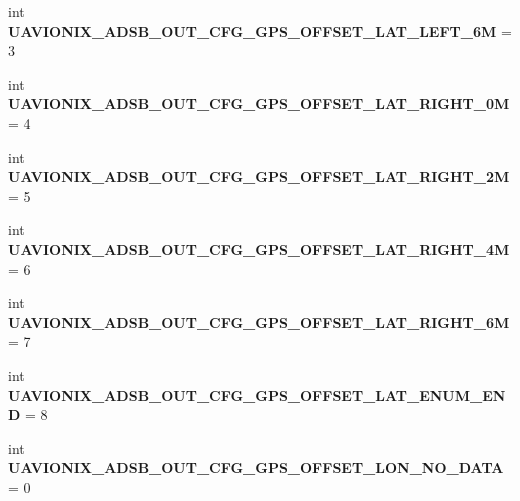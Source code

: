 \begin{DoxyCompactItemize}
\item 
\mbox{\label{namespacepymavlink_1_1dialects_1_1v10_a9ec2deef184e7d16b6c5f5db9652ba2f}} 
int {\bfseries U\+A\+V\+I\+O\+N\+I\+X\+\_\+\+A\+D\+S\+B\+\_\+\+O\+U\+T\+\_\+\+C\+F\+G\+\_\+\+G\+P\+S\+\_\+\+O\+F\+F\+S\+E\+T\+\_\+\+L\+A\+T\+\_\+\+L\+E\+F\+T\+\_\+6M} = 3
\item 
\mbox{\label{namespacepymavlink_1_1dialects_1_1v10_a5bbcbe4a5cdc7784f75c56dc4a454648}} 
int {\bfseries U\+A\+V\+I\+O\+N\+I\+X\+\_\+\+A\+D\+S\+B\+\_\+\+O\+U\+T\+\_\+\+C\+F\+G\+\_\+\+G\+P\+S\+\_\+\+O\+F\+F\+S\+E\+T\+\_\+\+L\+A\+T\+\_\+\+R\+I\+G\+H\+T\+\_\+0M} = 4
\item 
\mbox{\label{namespacepymavlink_1_1dialects_1_1v10_a95748bfd14f6b2c18cf0d106a6e2c0b7}} 
int {\bfseries U\+A\+V\+I\+O\+N\+I\+X\+\_\+\+A\+D\+S\+B\+\_\+\+O\+U\+T\+\_\+\+C\+F\+G\+\_\+\+G\+P\+S\+\_\+\+O\+F\+F\+S\+E\+T\+\_\+\+L\+A\+T\+\_\+\+R\+I\+G\+H\+T\+\_\+2M} = 5
\item 
\mbox{\label{namespacepymavlink_1_1dialects_1_1v10_a21522473ab06b875f9f2141cedf1bad9}} 
int {\bfseries U\+A\+V\+I\+O\+N\+I\+X\+\_\+\+A\+D\+S\+B\+\_\+\+O\+U\+T\+\_\+\+C\+F\+G\+\_\+\+G\+P\+S\+\_\+\+O\+F\+F\+S\+E\+T\+\_\+\+L\+A\+T\+\_\+\+R\+I\+G\+H\+T\+\_\+4M} = 6
\item 
\mbox{\label{namespacepymavlink_1_1dialects_1_1v10_a3e109602b1846c5718e919cb7b5ae41b}} 
int {\bfseries U\+A\+V\+I\+O\+N\+I\+X\+\_\+\+A\+D\+S\+B\+\_\+\+O\+U\+T\+\_\+\+C\+F\+G\+\_\+\+G\+P\+S\+\_\+\+O\+F\+F\+S\+E\+T\+\_\+\+L\+A\+T\+\_\+\+R\+I\+G\+H\+T\+\_\+6M} = 7
\item 
\mbox{\label{namespacepymavlink_1_1dialects_1_1v10_a7e420faff4cb3f61f220dee9a3fc668c}} 
int {\bfseries U\+A\+V\+I\+O\+N\+I\+X\+\_\+\+A\+D\+S\+B\+\_\+\+O\+U\+T\+\_\+\+C\+F\+G\+\_\+\+G\+P\+S\+\_\+\+O\+F\+F\+S\+E\+T\+\_\+\+L\+A\+T\+\_\+\+E\+N\+U\+M\+\_\+\+E\+ND} = 8
\item 
\mbox{\label{namespacepymavlink_1_1dialects_1_1v10_a7b92e0b543130262d80ec14a520e916c}} 
int {\bfseries U\+A\+V\+I\+O\+N\+I\+X\+\_\+\+A\+D\+S\+B\+\_\+\+O\+U\+T\+\_\+\+C\+F\+G\+\_\+\+G\+P\+S\+\_\+\+O\+F\+F\+S\+E\+T\+\_\+\+L\+O\+N\+\_\+\+N\+O\+\_\+\+D\+A\+TA} = 0

\end{DoxyCompactItemize}
